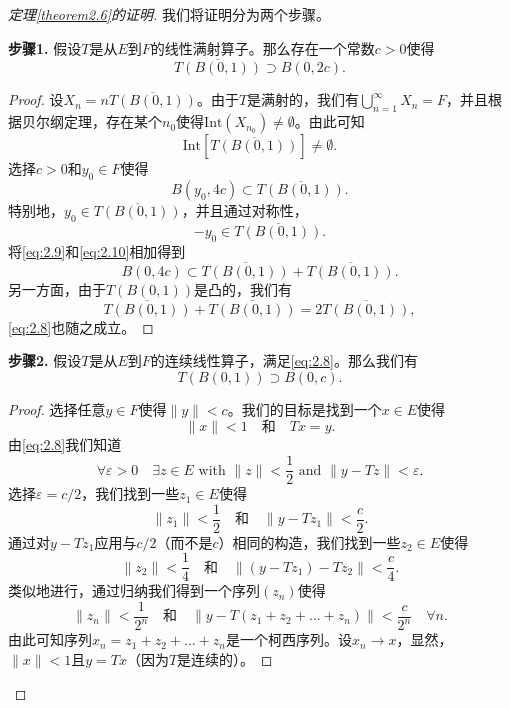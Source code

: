 \begin{proof}[定理\ref{theorem2.6}的证明]
我们将证明分为两个步骤。

\textbf{步骤1.} 假设$T$是从$E$到$F$的线性满射算子。那么存在一个常数$c>0$使得
\begin{equation}
\overline{T(B(0,1))} \supset B(0, 2c). \label{eq:2.8}
\end{equation}
\begin{proof}
设$X_n = n\overline{T(B(0,1))}$。由于$T$是满射的，我们有$\bigcup_{n=1}^\infty X_n = F$，并且根据贝尔纲定理，存在某个$n_0$使得$\text{Int}(X_{n_0}) \neq \emptyset$。由此可知
\[
\text{Int}[\overline{T(B(0,1))}] \neq \emptyset.
\]
选择$c>0$和$y_0 \in F$使得
\begin{equation}
B(y_0, 4c) \subset \overline{T(B(0,1))}. \label{eq:2.9}
\end{equation}
特别地，$y_0 \in \overline{T(B(0,1))}$，并且通过对称性，
\begin{equation}
-y_0 \in \overline{T(B(0,1))}. \label{eq:2.10}
\end{equation}
将\eqref{eq:2.9}和\eqref{eq:2.10}相加得到
\[
B(0, 4c) \subset \overline{T(B(0,1))} + \overline{T(B(0,1))}.
\]
另一方面，由于$T(B(0,1))$是凸的，我们有
\[
\overline{T(B(0,1))} + \overline{T(B(0,1))} = 2\overline{T(B(0,1))},
\]
\eqref{eq:2.8}也随之成立。
\end{proof}

\textbf{步骤2.} 假设$T$是从$E$到$F$的连续线性算子，满足\eqref{eq:2.8}。那么我们有
\begin{equation}
T(B(0,1)) \supset B(0,c). \label{eq:2.11}
\end{equation}
\begin{proof}
选择任意$y \in F$使得$\|y\|<c$。我们的目标是找到一个$x \in E$使得
\[
\|x\| < 1 \quad \text{和} \quad Tx=y.
\]
由\eqref{eq:2.8}我们知道
\begin{equation}
\forall \varepsilon > 0 \quad \exists z \in E \text{ with } \|z\| < \frac{1}{2} \text{ and } \|y - Tz\| < \varepsilon. \label{eq:2.12}
\end{equation}
选择$\varepsilon = c/2$，我们找到一些$z_1 \in E$使得
\[
\|z_1\| < \frac{1}{2} \quad \text{和} \quad \|y-Tz_1\| < \frac{c}{2}.
\]
通过对$y-Tz_1$应用与$c/2$（而不是$c$）相同的构造，我们找到一些$z_2 \in E$使得
\[
\|z_2\| < \frac{1}{4} \quad \text{和} \quad \|(y-Tz_1) - Tz_2\| < \frac{c}{4}.
\]
类似地进行，通过归纳我们得到一个序列$(z_n)$使得
\[
\|z_n\| < \frac{1}{2^n} \quad \text{和} \quad \|y-T(z_1+z_2+\dots+z_n)\| < \frac{c}{2^n} \quad \forall n.
\]
由此可知序列$x_n = z_1+z_2+\dots+z_n$是一个柯西序列。设$x_n \to x$，显然，$\|x\| < 1$且$y=Tx$（因为$T$是连续的）。
\end{proof}
\end{proof}

